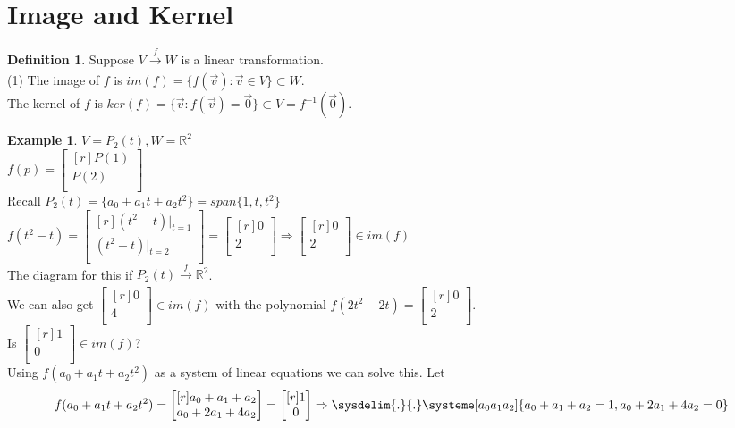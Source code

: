 \documentclass{report}
\theoremstyle{plain}
\theoremstyle{definition}
\newtheorem*{ex}{Example}
\newtheorem*{defn}{Definition}
\theoremstyle{plain}
\begin{document}
\section{Image and Kernel}
\begin{defn}
Suppose $V \xrightarrow[]{f} W$ is a linear transformation.\\
(1) The image of $f$ is $im(f)=\{f(\vec{v}): \vec{v}\in V\} \subset W$.\\
The kernel of $f$ is $ker(f)=\{\vec{v}:f(\vec{v})=\vec{0}\}\subset V = f^{-1}(\vec{0})$.
\end{defn}
\begin{ex}
$V=P_2(t), W=\mathbb{R}^2$\\
$f(p)=\begin{bmatrix}[r]P(1)\\P(2)\\\end{bmatrix}$\\
Recall $P_2(t)=\{a_0+a_1t+a_2t^2\} = span\{1,t,t^2\}$\\
$f(t^2-t)=\begin{bmatrix}[r](t^2-t)|_{t=1}\\(t^2-t)|_{t=2}\\\end{bmatrix}=\begin{bmatrix}[r]0\\2\\\end{bmatrix}\Rightarrow \begin{bmatrix}[r]0\\2\\\end{bmatrix}\in im(f)$\\
The diagram for this if $P_2(t)\xrightarrow[]{f} \mathbb{R}^2$.\\
We can also get $\begin{bmatrix}[r]0\\4\\\end{bmatrix} \in im(f)$ with the polynomial $f(2t^2-2t) = \begin{bmatrix}[r]0\\2\\\end{bmatrix}$.\\
Is $\begin{bmatrix}[r]1\\0\\\end{bmatrix} \in im(f)$?\\
Using $f(a_0+a_1t+a_2t^2)$ as a system of linear equations we can solve this. Let
\[ f(a_0+a_1t+a_2t^2) = \begin{bmatrix}[r]a_0+a_1+a_2\\a_0+2a_1+4a_2\\\end{bmatrix} = \begin{bmatrix}[r]1\\0\\\end{bmatrix} \Rightarrow \sysdelim{.}{.}\systeme[a_0a_1a_2]{a_0+a_1+a_2=1,a_0+2a_1+4a_2=0} \]
\end{ex}
\end{document}
